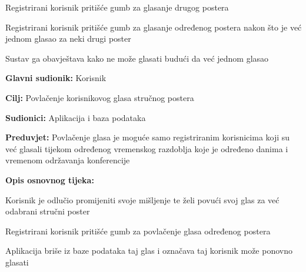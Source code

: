 \begin{packed_item}
\begin{packed_item}
\begin{packed_enum}
						\end{packed_enum}
						
						\item[3.b] Registrirani korisnik pritišće gumb za glasanje drugog postera
						\item[] \begin{packed_enum}
							
							\item Registrirani korisnik pritišće gumb za glasanje određenog postera nakon što je već jednom glasao za neki drugi poster
							\item Sustav ga obavještava kako ne može glasati budući da već jednom glasao
							
						\end{packed_enum}
						
						
					\end{packed_item}
				\end{packed_item}
				
				
				\noindent {}
				\begin{packed_item}
					
					\item \textbf{Glavni sudionik: }Korisnik
					\item  \textbf{Cilj:} Povlačenje korisnikovog glasa stručnog postera
					\item  \textbf{Sudionici:} Aplikacija i baza podataka
					\item  \textbf{Preduvjet:} Povlačenje glasa je moguće samo registriranim korisnicima koji su već glasali tijekom određenog vremenskog razdoblja koje je određeno danima i vremenom održavanja konferencije
					\item  \textbf{Opis osnovnog tijeka:}
					
					\item[] \begin{packed_enum}
						
						\item Korisnik je odlučio promijeniti svoje mišljenje te želi povući svoj glas za već odabrani stručni poster
						\item Registrirani korisnik pritišće gumb za povlačenje glasa određenog postera
						\item Aplikacija briše iz baze podataka taj glas i označava taj korisnik može ponovno glasati
					\end{packed_enum}
					
					
				\end{packed_item}
				
